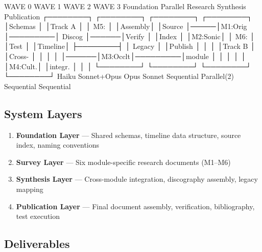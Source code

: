 \documentclass[11pt,letterpaper]{article}
\begin{document}
\begin{asciibox}
  WAVE 0          WAVE 1              WAVE 2          WAVE 3
  Foundation      Parallel Research   Synthesis        Publication
  ┌────────┐      ┌────────┐         ┌────────┐      ┌────────┐
  │Schemas │      │Track A │         │ M5:    │      │Assembly│
  │Source   │─────│M1:Orig │─────────│ Discog │──────│Verify  │
  │Index   │      │M2:Sonic│         │ M6:    │      │Test    │
  │Timeline│      ├────────┤         │ Legacy │      │Publish │
  │        │      │Track B │         │Cross-  │      │        │
  │        │──────│M3:Occlt│─────────│module  │      │        │
  │        │      │M4:Cult.│         │integr. │      │        │
  └────────┘      └────────┘         └────────┘      └────────┘
   Haiku           Sonnet+Opus        Opus             Sonnet
   Sequential      Parallel(2)        Sequential       Sequential
\end{asciibox}

\subsection{System Layers}

\begin{enumerate}[label=\arabic*., leftmargin=2em]
\item \textbf{Foundation Layer} --- Shared schemas, timeline data structure, source index, naming conventions
\item \textbf{Survey Layer} --- Six module-specific research documents (M1--M6)
\item \textbf{Synthesis Layer} --- Cross-module integration, discography assembly, legacy mapping
\item \textbf{Publication Layer} --- Final document assembly, verification, bibliography, test execution
\end{enumerate}

\subsection{Deliverables}
\end{document}
